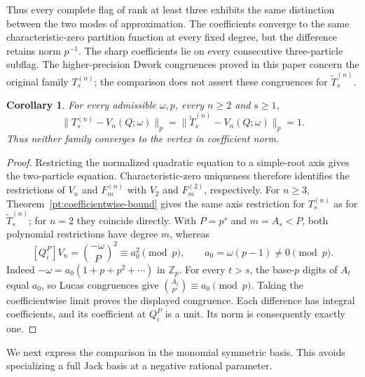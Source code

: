\documentclass[11pt]{amsart}
\newtheorem{corollary}[theorem]{Corollary}
\theoremstyle{definition}
\theoremstyle{remark}
\numberwithin{equation}{section}
\newcommand{\Z}{\mathbb Z}
\begin{document}
Thus every complete flag of rank at least three exhibits the
same distinction between the two modes of approximation. The
coefficients converge to the same characteristic-zero partition
function at every fixed degree, but the difference retains norm
$p^{-1}$. The sharp coefficients lie on every consecutive
three-particle subflag. The higher-precision Dwork congruences
proved in this paper concern the original family $T_s^{(n)}$;
the comparison does not assert these congruences for
$\widetilde T_s^{(n)}$.

\begin{corollary}\label{pt:distance-to-limit}
For every admissible $\omega,p$, every $n\geq2$ and $s\geq1$,
\[
 \|T_s^{(n)}-V_n(Q;\omega)\|_p
 =\|\widetilde T_s^{(n)}-V_n(Q;\omega)\|_p=1.
\]
Thus neither family converges to the vertex in coefficient norm.
\end{corollary}

\begin{proof}
Restricting the normalized quadratic equation to a simple-root
axis gives the two-particle equation. Characteristic-zero
uniqueness therefore identifies the restrictions of $V_n$ and
$F_m^{(n)}$ with $V_2$ and $F_m^{(2)}$, respectively.
For $n\geq3$, Theorem~\ref{pt:coefficientwise-bound} gives
the same axis restriction for $T_s^{(n)}$ as for
$\widetilde T_s^{(n)}$; for $n=2$ they coincide directly.
With $P=p^s$ and $m=A_s<P$, both polynomial restrictions have
degree $m$, whereas
\[
 [Q_i^P]V_n=\binom{-\omega}{P}^{\!2}\equiv a_0^2\pmod p,
 \qquad a_0=\omega(p-1)\ne0\pmod p.
\]
Indeed $-\omega=a_0(1+p+p^2+\cdots)$ in $\Z_p$.
For every $t>s$, the base-$p$ digits of $A_t$ equal $a_0$,
so Lucas congruences give $\binom{A_t}{p^s}\equiv a_0\pmod p$.
Taking the coefficientwise limit proves the displayed congruence.
Each difference has integral coefficients, and its coefficient
at $Q_i^P$ is a unit. Its norm is consequently exactly one.
\end{proof}


We next express the comparison in the monomial symmetric
basis. This avoids specializing a
full Jack basis at a negative rational parameter.
\end{document}
